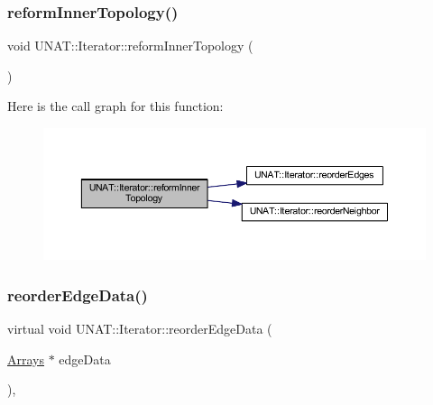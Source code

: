 \subsubsection{\texorpdfstring{reformInnerTopology()}{reformInnerTopology()}\hspace{0.1cm}{\footnotesize\ttfamily [2/2]}}
{\footnotesize\ttfamily void U\+N\+A\+T\+::\+Iterator\+::reform\+Inner\+Topology (\begin{DoxyParamCaption}{ }\end{DoxyParamCaption})\hspace{0.3cm}{\ttfamily [inline]}}

Here is the call graph for this function\+:
\nopagebreak
\begin{figure}[H]
\begin{center}
\leavevmode
\includegraphics[width=350pt]{classUNAT_1_1Iterator_ad25934bd952c01d0a82d3db33e46604a_cgraph}
\end{center}
\end{figure}
\mbox{\label{classUNAT_1_1Iterator_a9272c47e4e6c7636366c720de203edb6}} 
\subsubsection{\texorpdfstring{reorderEdgeData()}{reorderEdgeData()}\hspace{0.1cm}{\footnotesize\ttfamily [1/2]}}
{\footnotesize\ttfamily virtual void U\+N\+A\+T\+::\+Iterator\+::reorder\+Edge\+Data (\begin{DoxyParamCaption}\item[{\mbox{\hyperlink{structArrays}{Arrays}} $\ast$}]{edge\+Data }\end{DoxyParamCaption})\hspace{0.3cm}{\ttfamily [inline]}, {\ttfamily [virtual]}}

\mbox{\label{classUNAT_1_1Iterator_a9272c47e4e6c7636366c720de203edb6}} 
